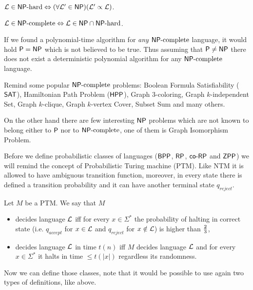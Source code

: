 		\begin{defn}
			${\cal L}\in\NPH \iff (\forall{\cal L'}\in\NP)({\cal L'}\propto{\cal L})$.
		\end{defn}
		
		\begin{defn}
			${\cal L}\in\NPC\iff{\cal L}\in\NP\cap\NPH$.
		\end{defn}
		
		\begin{note}
			If we found a polynomial-time algorithm for {\em any} $\NPC$ language, it would hold $\P=\NP$ which is not believed to be true. Thus assuming that $\P\neq\NP$ there does not exist a deterministic polynomial algorithm for any $\NPC$ language.
		\end{note}
		
		\begin{example}\label{exm:npc}
			Remind some popular $\NPC$ problems: Boolean Formula Satisfiability ($\sf SAT$), Hamiltonian Path Problem ($\sf HPP$), Graph $3$-coloring, Graph $k$-independent Set, Graph $k$-clique, Graph $k$-vertex Cover, Subset Sum and many others.
			
			On the other hand there are few interesting $\NP$ problems which are not known to belong either to $\P$ nor to $\NPC$, one of them is Graph Isomorphism Problem.
		\end{example}
		
		
		Before we define probabilistic classes of languages ($\BPP$, $\RP$, $\coRP$ and $\ZPP$) we will remind the concept of Probabilistic Turing machine (PTM). Like NTM it is allowed to have ambiguous transition function, moreover, in every state there is defined a transition probability and it can have another terminal state $q_{reject}$.
		
		Let $M$ be a PTM. We say that $M$
		\begin{itemize}
			\item decides language $\cal L$ iff for every $x\in\Sigma^*$ the probability of halting in correct state (i.e. $q_{accept}$ for $x\in{\cal L}$ and $q_{reject}$ for $x\notin{\cal L}$) is higher than $\nicefrac{2}{3}$,
			\item decides language $\cal L$ in time $t(n)$ iff $M$ decides language $\cal L$ and for every $x\in\Sigma^*$ it halts in time $\leq t(|x|)$ regardless its randomness.
		\end{itemize}
		Now we can define those classes, note that it would be possible to use again two types of definitions, like above.
		
